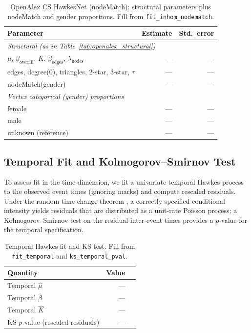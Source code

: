 \documentclass[12pt]{article}
\begin{document}
\begin{table}[htbp]
\centering
\caption{OpenAlex CS HawkesNet (nodeMatch): structural parameters plus nodeMatch and gender proportions. Fill from \texttt{fit\_inhom\_nodematch}.}
\label{tab:openalex_nodematch}
\begin{tabular}{lrr}
\toprule
Parameter & Estimate & Std.\ error \\
\midrule
\multicolumn{3}{l}{\textit{Structural (as in Table~\ref{tab:openalex_structural})}} \\
$\mu$, $\beta_{\text{overall}}$, $K$, $\beta_{\text{edges}}$, $\lambda_{\text{nodes}}$ & --- & --- \\
edges, degree(0), triangles, 2-star, 3-star, $\tau$ & --- & --- \\
\midrule
nodeMatch(gender) & --- & --- \\
\midrule
\multicolumn{3}{l}{\textit{Vertex categorical (gender) proportions}} \\
female & --- & --- \\
male & --- & --- \\
unknown (reference) & --- & --- \\
\bottomrule
\end{tabular}
\end{table}

\subsection{Temporal Fit and Kolmogorov--Smirnov Test}

To assess fit in the time dimension, we fit a univariate temporal Hawkes process to the observed event times (ignoring marks) and compute rescaled residuals. Under the random time-change theorem \citep[Proposition 7.4.VI]{daley2003introduction}, a correctly specified conditional intensity yields residuals that are distributed as a unit-rate Poisson process; a Kolmogorov--Smirnov test on the residual inter-event times provides a $p$-value for the temporal specification.

\begin{table}[htbp]
\centering
\caption{Temporal Hawkes fit and KS test. Fill from \texttt{fit\_temporal} and \texttt{ks\_temporal\_pval}.}
\label{tab:openalex_temporal}
\begin{tabular}{lrr}
\toprule
Quantity & Value \\
\midrule
Temporal $\hat{\mu}$ & --- \\
Temporal $\hat{\beta}$ & --- \\
Temporal $\hat{K}$ & --- \\
KS $p$-value (rescaled residuals) & --- \\
\bottomrule
\end{tabular}
\end{table}
\end{document}
